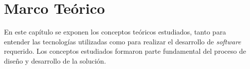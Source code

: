 \chapter{Marco Teórico} \label{chap:Marco Teorico}

En este capítulo se exponen los conceptos teóricos estudiados, tanto para entender las tecnologías utilizadas como para realizar el desarrollo de \textit{software} requerido. Los conceptos estudiados formaron parte fundamental del proceso de diseño y desarrollo de la solución.
